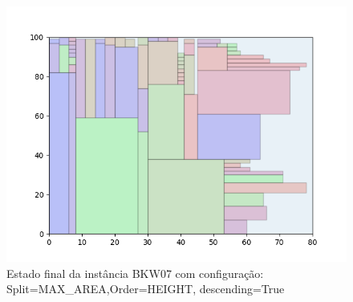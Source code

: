 \begin{figure}[H]
    \centering
    \caption[]{Estado final da instância BKW07 com configuração: Split=MAX_AREA,Order=HEIGHT, descending=True}
    \label{fig:bkw07-max_area-height-true}
    \includegraphics[scale=0.5]{output/figures/bkw/bkw07/max_area/height/true/00}
\end{figure}